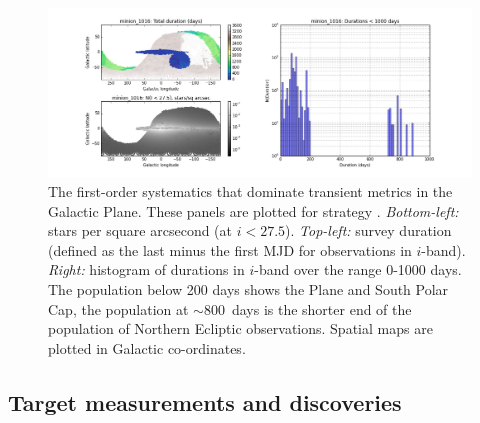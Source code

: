 \begin{figure}
    \includegraphics[width=6.0in]{./figs/milkyway/durations_minion_1016.png}
  \caption{The first-order systematics that dominate transient metrics in the Galactic Plane. These panels are plotted for strategy . {\it Bottom-left:} stars per square arcsecond (at $i < 27.5$). {\it Top-left:} survey duration (defined as the last minus the first MJD for observations in $i$-band). {\it Right:} histogram of durations in $i$-band over the range 0-1000 days. The population below 200 days shows the Plane and South Polar Cap, the population at $\sim 800$~days is the shorter end of the population of Northern Ecliptic observations. Spatial maps are plotted in Galactic co-ordinates.}
\label{fig_durationInGalacticCoords}
\end{figure}



\subsection{Target measurements and discoveries}
\label{sec:\secname:MW_Disk_targets}




